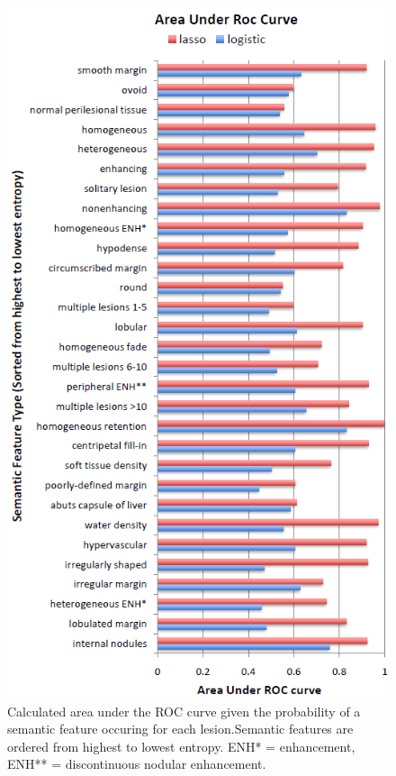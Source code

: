 \begin{figure}
	\centering
	\includegraphics[width=\textwidth,height=\textheight,keepaspectratio]{figures/liver_auc}
	\caption{Calculated area under the ROC curve given the probability of a semantic feature occuring for each lesion.Semantic features are ordered from highest to lowest entropy. ENH* = enhancement, ENH** = discontinuous nodular enhancement.}
	\label{fig:liver_auc}
\end{figure}


